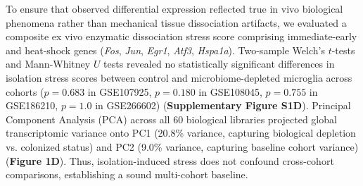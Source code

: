 \documentclass[10pt,a4paper]{article}
\begin{document}
To ensure that observed differential expression reflected true in vivo biological phenomena rather than mechanical tissue dissociation artifacts, we evaluated a composite ex vivo enzymatic dissociation stress score comprising immediate-early and heat-shock genes (\textit{Fos}, \textit{Jun}, \textit{Egr1}, \textit{Atf3}, \textit{Hspa1a})\cite{van2017_16,marsh2022_17}. Two-sample Welch's $t$-tests and Mann-Whitney $U$ tests revealed no statistically significant differences in isolation stress scores between control and microbiome-depleted microglia across cohorts ($p = 0.683$ in GSE107925, $p = 0.180$ in GSE108045, $p = 0.755$ in GSE186210, $p = 1.0$ in GSE266602) (\textbf{Supplementary Figure S1D}). Principal Component Analysis (PCA) across all 60 biological libraries projected global transcriptomic variance onto PC1 (20.8\% variance, capturing biological depletion vs. colonized status) and PC2 (9.0\% variance, capturing baseline cohort variance) (\textbf{Figure 1D}). Thus, isolation-induced stress does not confound cross-cohort comparisons, establishing a sound multi-cohort baseline.
\end{document}
